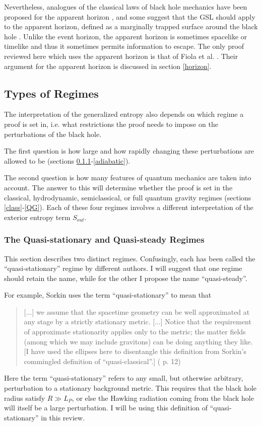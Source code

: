 \documentclass{article}
\begin{document}
Nevertheless, analogues of the classical laws of black hole mechanics have been proposed for the apparent horizon \cite{hayward93}, and some suggest that the GSL should apply to the apparent horizon, defined as a marginally trapped surface around the black hole \cite{ZWGA07}.  Unlike the event horizon, the apparent horizon is sometimes spacelike or timelike and thus it sometimes permits information to escape.  The only proof reviewed here which uses the apparent horizon is that of Fiola et al. \cite{fiola94}.  Their argument for the apparent horizon is discussed in section \ref{horizon}.

\subsection{Types of Regimes}\label{regimes}

The interpretation of the generalized entropy also depends on which regime a proof is set in, i.e. what restrictions the proof needs to impose on the perturbations of the black hole.

The first question is how large and how rapidly changing these perturbations are allowed to be (sections \ref{quasi}-\ref{adiabatic}).

The second question is how many features of quantum mechanics are taken into account.  The answer to this will determine whether the proof is set in the classical, hydrodynamic, semiclassical, or full quantum gravity regimes (sections \ref{class}-\ref{QG}).  Each of these four regimes involves a different interpretation of the exterior entropy term $S_{out}$.

\subsubsection{The Quasi-stationary and Quasi-steady Regimes}\label{quasi}

This section describes two distinct regimes.  Confusingly, each has been called the ``quasi-stationary'' regime by different authors.  I will suggest that one regime should retain the name, while for the other I propose the name ``quasi-steady''.

For example, Sorkin uses the term ``quasi-stationary'' to mean that
\begin{quote}\small
[...] we assume that the spacetime geometry can be well approximated at any stage by a strictly stationary metric. [...] Notice that the requirement of approximate stationarity applies only to the metric; the matter fields (among which we may include gravitons) can be doing anything they like.  [I have used the ellipses here to disentangle this definition from Sorkin's commingled definition of ``quasi-classical''.] (\cite{sorkin98} p. 12) \end{quote}
Here the term ``quasi-stationary'' refers to any small, but otherwise arbitrary, perturbation to a stationary background metric.  This requires that the black hole radius satisfy $R \gg L_P$, or else the Hawking radiation coming from the black hole will itself be a large perturbation.  I will be using this definition of ``quasi-stationary'' in this review.
\end{document}
